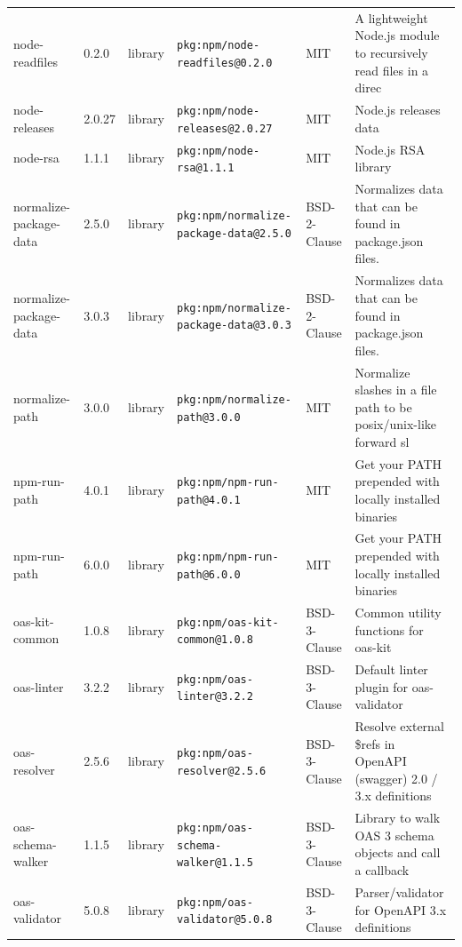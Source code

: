 \documentclass[11pt,a4paper]{article}
\begin{document}
\begin{longtable}{|p{4cm}|p{2cm}|p{1.6cm}|p{5cm}|p{1.5cm}|p{3.5cm}|}
\raggedright node-readfiles & 0.2.0 & library & \small\texttt{pkg:npm/node-readfiles@0.2.0} & MIT & \small A lightweight Node.js module to recursively read files in a direc \\
\raggedright node-releases & 2.0.27 & library & \small\texttt{pkg:npm/node-releases@2.0.27} & MIT & \small Node.js releases data \\
\raggedright node-rsa & 1.1.1 & library & \small\texttt{pkg:npm/node-rsa@1.1.1} & MIT & \small Node.js RSA library \\
\raggedright normalize-package-data & 2.5.0 & library & \small\texttt{pkg:npm/normalize-package-data@2.5.0} & BSD-2-Clause & \small Normalizes data that can be found in package.json files. \\
\raggedright normalize-package-data & 3.0.3 & library & \small\texttt{pkg:npm/normalize-package-data@3.0.3} & BSD-2-Clause & \small Normalizes data that can be found in package.json files. \\
\raggedright normalize-path & 3.0.0 & library & \small\texttt{pkg:npm/normalize-path@3.0.0} & MIT & \small Normalize slashes in a file path to be posix/unix-like forward sl \\
\raggedright npm-run-path & 4.0.1 & library & \small\texttt{pkg:npm/npm-run-path@4.0.1} & MIT & \small Get your PATH prepended with locally installed binaries \\
\raggedright npm-run-path & 6.0.0 & library & \small\texttt{pkg:npm/npm-run-path@6.0.0} & MIT & \small Get your PATH prepended with locally installed binaries \\
\raggedright oas-kit-common & 1.0.8 & library & \small\texttt{pkg:npm/oas-kit-common@1.0.8} & BSD-3-Clause & \small Common utility functions for oas-kit \\
\raggedright oas-linter & 3.2.2 & library & \small\texttt{pkg:npm/oas-linter@3.2.2} & BSD-3-Clause & \small Default linter plugin for oas-validator \\
\raggedright oas-resolver & 2.5.6 & library & \small\texttt{pkg:npm/oas-resolver@2.5.6} & BSD-3-Clause & \small Resolve external \$refs in OpenAPI (swagger) 2.0 / 3.x definitions \\
\raggedright oas-schema-walker & 1.1.5 & library & \small\texttt{pkg:npm/oas-schema-walker@1.1.5} & BSD-3-Clause & \small Library to walk OAS 3 schema objects and call a callback \\
\raggedright oas-validator & 5.0.8 & library & \small\texttt{pkg:npm/oas-validator@5.0.8} & BSD-3-Clause & \small Parser/validator for OpenAPI 3.x definitions \\

\end{longtable}
\end{document}
